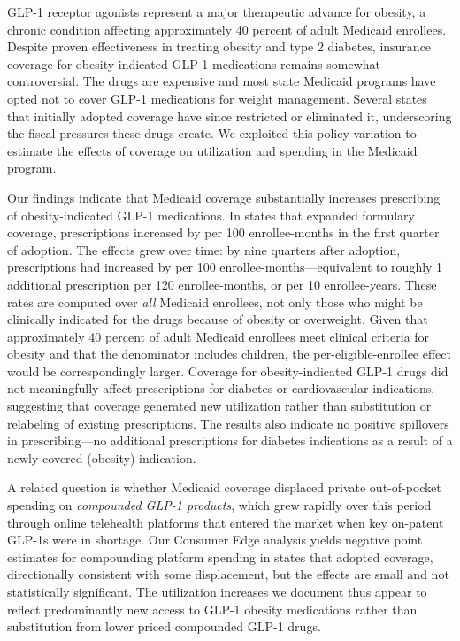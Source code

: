 \label{sec:discussion}

GLP-1 receptor agonists represent a major therapeutic advance for obesity, a chronic condition affecting approximately 40 percent of adult Medicaid enrollees. Despite proven effectiveness in treating obesity and type 2 diabetes, insurance coverage for obesity-indicated GLP-1 medications remains somewhat controversial. The drugs are expensive and most state Medicaid programs have opted not to cover GLP-1 medications for weight management. Several states that initially adopted coverage have since restricted or eliminated it, underscoring the fiscal pressures these drugs create. We exploited this policy variation to estimate the effects of coverage on utilization and spending in the Medicaid program.

Our findings indicate that Medicaid coverage substantially increases prescribing of obesity-indicated GLP-1 medications. In states that expanded formulary coverage, prescriptions increased by \rxObSevenZeroEmw{} per 100 enrollee-months in the first quarter of adoption. The effects grew over time: by nine quarters after adoption, prescriptions had increased by \rxObSevenNineEmw{} per 100 enrollee-months---equivalent to roughly 1 additional prescription per 120 enrollee-months, or per 10 enrollee-years. These rates are computed over \emph{all} Medicaid enrollees, not only those who might be clinically indicated for the drugs because of obesity or overweight. Given that approximately 40 percent of adult Medicaid enrollees meet clinical criteria for obesity and that the denominator includes children, the per-eligible-enrollee effect would be correspondingly larger. Coverage for obesity-indicated GLP-1 drugs did not meaningfully affect prescriptions for diabetes or cardiovascular indications, suggesting that coverage generated new utilization rather than substitution or relabeling of existing prescriptions. The results also indicate no positive spillovers in prescribing---no additional prescriptions for diabetes indications as a result of a newly covered (obesity) indication.

A related question is whether Medicaid coverage displaced private out-of-pocket spending on \emph{compounded GLP-1 products}, which grew rapidly over this period through online telehealth platforms that entered the market when key on-patent GLP-1s were in shortage. Our Consumer Edge analysis yields negative point estimates for compounding platform spending in states that adopted coverage, directionally consistent with some displacement, but the effects are small and not statistically significant. The utilization increases we document thus appear to reflect predominantly new access to GLP-1 obesity medications rather than substitution from lower priced compounded GLP-1 drugs.


